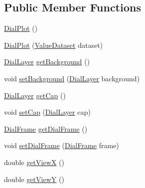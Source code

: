 \subsection*{Public Member Functions}
\begin{DoxyCompactItemize}
\item 
\mbox{\hyperlink{classorg_1_1jfree_1_1chart_1_1plot_1_1dial_1_1_dial_plot_a6f1f30ea59562508338484e92900360a}{Dial\+Plot}} ()
\item 
\mbox{\hyperlink{classorg_1_1jfree_1_1chart_1_1plot_1_1dial_1_1_dial_plot_a4648395f622216607378a746010a1f43}{Dial\+Plot}} (\mbox{\hyperlink{interfaceorg_1_1jfree_1_1data_1_1general_1_1_value_dataset}{Value\+Dataset}} dataset)
\item 
\mbox{\hyperlink{interfaceorg_1_1jfree_1_1chart_1_1plot_1_1dial_1_1_dial_layer}{Dial\+Layer}} \mbox{\hyperlink{classorg_1_1jfree_1_1chart_1_1plot_1_1dial_1_1_dial_plot_abe1006904f1a489ca3f4e53f1cad953c}{get\+Background}} ()
\item 
void \mbox{\hyperlink{classorg_1_1jfree_1_1chart_1_1plot_1_1dial_1_1_dial_plot_a0b16b2d5119b933d96683c5737fca45d}{set\+Background}} (\mbox{\hyperlink{interfaceorg_1_1jfree_1_1chart_1_1plot_1_1dial_1_1_dial_layer}{Dial\+Layer}} background)
\item 
\mbox{\hyperlink{interfaceorg_1_1jfree_1_1chart_1_1plot_1_1dial_1_1_dial_layer}{Dial\+Layer}} \mbox{\hyperlink{classorg_1_1jfree_1_1chart_1_1plot_1_1dial_1_1_dial_plot_a4bfa1709db2fe99136ddcf2ee890c0ef}{get\+Cap}} ()
\item 
void \mbox{\hyperlink{classorg_1_1jfree_1_1chart_1_1plot_1_1dial_1_1_dial_plot_a895fa9fbd692fdac0884f21e809871a5}{set\+Cap}} (\mbox{\hyperlink{interfaceorg_1_1jfree_1_1chart_1_1plot_1_1dial_1_1_dial_layer}{Dial\+Layer}} cap)
\item 
\mbox{\hyperlink{interfaceorg_1_1jfree_1_1chart_1_1plot_1_1dial_1_1_dial_frame}{Dial\+Frame}} \mbox{\hyperlink{classorg_1_1jfree_1_1chart_1_1plot_1_1dial_1_1_dial_plot_ad7f8de956f589e9503b74c8713f93145}{get\+Dial\+Frame}} ()
\item 
void \mbox{\hyperlink{classorg_1_1jfree_1_1chart_1_1plot_1_1dial_1_1_dial_plot_a02b28d69fba2ec6dfa3420b29213f51d}{set\+Dial\+Frame}} (\mbox{\hyperlink{interfaceorg_1_1jfree_1_1chart_1_1plot_1_1dial_1_1_dial_frame}{Dial\+Frame}} frame)
\item 
double \mbox{\hyperlink{classorg_1_1jfree_1_1chart_1_1plot_1_1dial_1_1_dial_plot_a62ca88c6259e7da0f683c23d94131fa8}{get\+ViewX}} ()
\item 
double \mbox{\hyperlink{classorg_1_1jfree_1_1chart_1_1plot_1_1dial_1_1_dial_plot_ac3bba6749d33bc59f1a9f33a5f850db1}{get\+ViewY}} ()

\end{DoxyCompactItemize}
